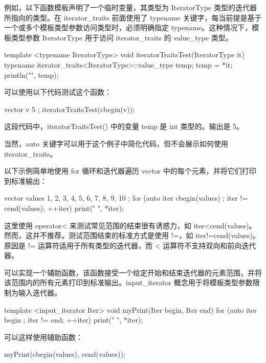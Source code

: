 例如，以下函数模板声明了一个临时变量，其类型为 IteratorType 类型的迭代器所指向的类型。在 iterator\_traits 前面使用了 typename 关键字，每当前提是基于一个或多个模板类型参数访问类型时，必须明确指定 typename。这种情况下，模板类型参数 IteratorType 用于访问 iterator\_traits 的 value\_type 类型。

\begin{cpp}
template <typename IteratorType>
void iteratorTraitsTest(IteratorType it)
{
    typename iterator_traits<IteratorType>::value_type temp;
    temp = *it;
    println("{}", temp);
}
\end{cpp}

可以使用以下代码测试这个函数：

\begin{cpp}
vector v { 5 };
iteratorTraitsTest(cbegin(v));
\end{cpp}

这段代码中，iteratorTraitsTest() 中的变量 temp 是 int 类型的。输出是 5。

当然，auto 关键字可以用于这个例子中简化代码，但不会展示如何使用 iterator\_traits。


以下示例简单地使用 for 循环和迭代器遍历 vector 中的每个元素，并将它们打印到标准输出：

\begin{cpp}
vector values { 1, 2, 3, 4, 5, 6, 7, 8, 9, 10 };
for (auto iter { cbegin(values) }; iter != cend(values); ++iter) {
    print("{} ", *iter);
}
\end{cpp}

这里使用 operator< 来测试常见范围的结束很有诱惑力，如 iter<cend(values)。然而，这并不推荐。测试范围结束的标准方式是使用 !=，如 iter!=cend(values)。原因是 != 运算符适用于所有类型的迭代器，而 < 运算符不支持双向和前向迭代器。

可以实现一个辅助函数，该函数接受一个给定开始和结束迭代器的元素范围，并将该范围内的所有元素打印到标准输出。input\_iterator 概念用于将模板类型参数限制为输入迭代器。

\begin{cpp}
template <input_iterator Iter>
void myPrint(Iter begin, Iter end)
{
    for (auto iter { begin }; iter != end; ++iter) { print("{} ", *iter); }
}
\end{cpp}

可以这样使用辅助函数：

\begin{cpp}
myPrint(cbegin(values), cend(values));
\end{cpp}

